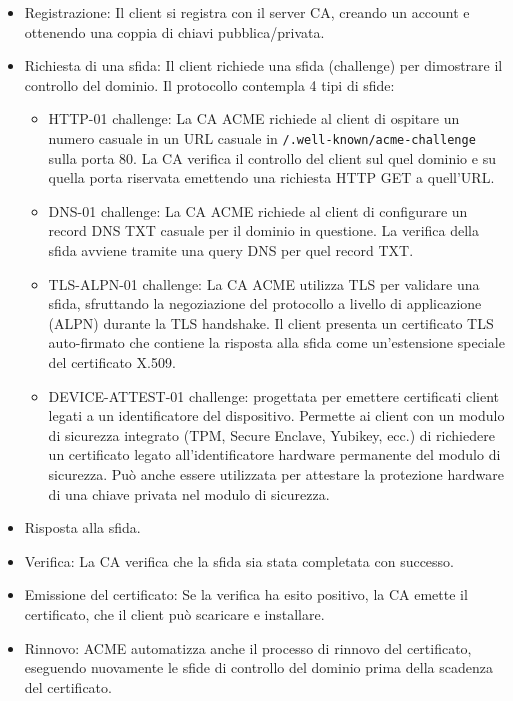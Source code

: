 \documentclass[12pt,a4paper]{report}
\begin{document}
\begin{itemize}
    \item Registrazione: Il client si registra con il server CA, creando un account e ottenendo una coppia di chiavi pubblica/privata.
    \item Richiesta di una sfida: Il client richiede una sfida (challenge) per dimostrare il controllo del dominio. Il protocollo contempla 4 tipi di sfide:
    \begin{itemize}
        \item HTTP-01 challenge: La CA ACME richiede al client di ospitare un numero casuale in un URL casuale in \texttt{/.well-known/acme-challenge} sulla porta 80. La CA verifica il controllo del client sul quel dominio e su quella porta riservata emettendo una richiesta HTTP GET a quell'URL.
        \item DNS-01 challenge: La CA ACME richiede al client di configurare un record DNS TXT casuale per il dominio in questione. La verifica della sfida avviene tramite una query DNS per quel record TXT.
        \item TLS-ALPN-01 challenge: La CA ACME utilizza TLS per validare una sfida, sfruttando la negoziazione del protocollo a livello di applicazione (ALPN) durante la TLS handshake. Il client presenta un certificato TLS auto-firmato che contiene la risposta alla sfida come un'estensione speciale del certificato X.509.
        \item DEVICE-ATTEST-01 challenge: progettata per emettere certificati client legati a un identificatore del dispositivo. Permette ai client con un modulo di sicurezza integrato (TPM, Secure Enclave, Yubikey, ecc.) di richiedere un certificato legato all'identificatore hardware permanente del modulo di sicurezza. Può anche essere utilizzata per attestare la protezione hardware di una chiave privata nel modulo di sicurezza.
    \end{itemize}
    \item Risposta alla sfida.
    \item Verifica: La CA verifica che la sfida sia stata completata con successo.
    \item Emissione del certificato: Se la verifica ha esito positivo, la CA emette il certificato, che il client può scaricare e installare.
    \item Rinnovo: ACME automatizza anche il processo di rinnovo del certificato, eseguendo nuovamente le sfide di controllo del dominio prima della scadenza del certificato.
\end{itemize}
\end{document}
